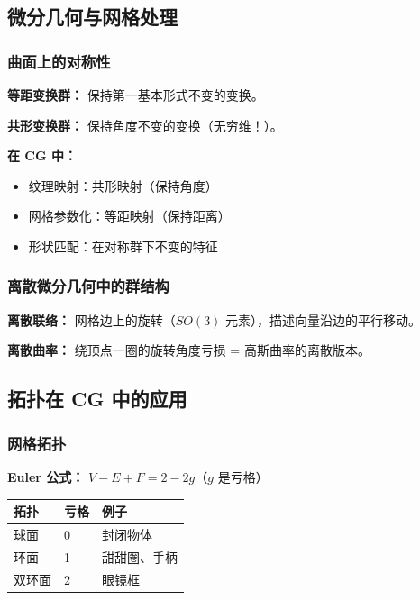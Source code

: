 \subsection{微分几何与网格处理}

\subsubsection{曲面上的对称性}

\textbf{等距变换群：} 保持第一基本形式不变的变换。

\textbf{共形变换群：} 保持角度不变的变换（无穷维！）。

\textbf{在 CG 中：}
\begin{itemize}
  \item 纹理映射：共形映射（保持角度）
  \item 网格参数化：等距映射（保持距离）
  \item 形状匹配：在对称群下不变的特征
\end{itemize}

\subsubsection{离散微分几何中的群结构}

\textbf{离散联络：} 网格边上的旋转（$SO(3)$ 元素），描述向量沿边的平行移动。

\textbf{离散曲率：} 绕顶点一圈的旋转角度亏损 = 高斯曲率的离散版本。

\subsection{拓扑在 CG 中的应用}

\subsubsection{网格拓扑}

\textbf{Euler 公式：} $V - E + F = 2 - 2g$（$g$ 是亏格）

\begin{center}
\begin{tabular}{L{3cm}L{2cm}L{5cm}}
\toprule
\textbf{拓扑} & \textbf{亏格} & \textbf{例子} \\
\midrule
球面 & 0 & 封闭物体 \\
环面 & 1 & 甜甜圈、手柄 \\
双环面 & 2 & 眼镜框 \\
\bottomrule
\end{tabular}
\end{center}

